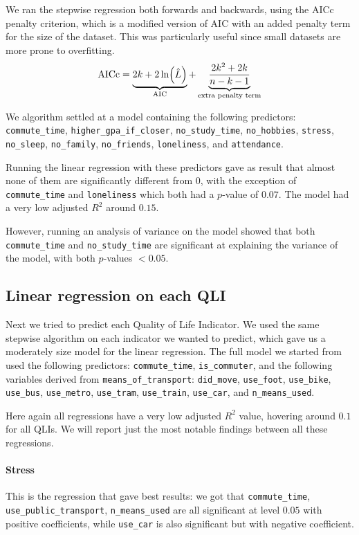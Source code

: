 \documentclass[11pt]{extarticle}
\numberwithin{table}{section}
\numberwithin{figure}{section}
\numberwithin{equation}{section}
\begin{document}
We ran the stepwise regression both forwards and backwards,
using the AICc penalty criterion, which is a modified version of AIC with an added penalty term
for the size of the dataset.
This was particularly useful since small datasets are more prone to overfitting.
\begin{equation}
	{\operatorfont AICc} =
	\underbrace{2k + 2 \ln (\hat L)}_{\operatorfont AIC}
	+ \underbrace{\frac {2k^{2}+2k}{n-k-1}}_{\text{extra penalty term}}
\end{equation}

We algorithm settled at a model containing the following predictors:
\texttt{commute\_time},
\texttt{higher\_gpa\_if\_closer},
\texttt{no\_study\_time},
\texttt{no\_hobbies},
\texttt{stress},
\texttt{no\_sleep},
\texttt{no\_family},
\texttt{no\_friends},
\texttt{loneliness}, and
\texttt{attendance}.

Running the linear regression with these predictors gave as result that almost none of them
are significantly different from $0$, with the exception of
\texttt{commute\_time} and \texttt{loneliness} which both had a $p$-value of $0.07$.
The model had a very low adjusted $R^2$ around $0.15$.

However, running an analysis of variance on the model showed that both
\texttt{commute\_time} and \texttt{no\_study\_time} are significant
at explaining the variance of the model, with both $p$-values $<0.05$.

\subsection{Linear regression on each QLI}

Next we tried to predict each Quality of Life Indicator.
We used the same stepwise algorithm on each indicator we wanted to predict,
which gave us a moderately size model for the linear regression.
The full model we started from used the following predictors:
\texttt{commute\_time},
\texttt{is\_commuter}, and the following variables derived from \texttt{means\_of\_transport}:
\texttt{did\_move},
\texttt{use\_foot},
\texttt{use\_bike},
\texttt{use\_bus},
\texttt{use\_metro},
\texttt{use\_tram},
\texttt{use\_train},
\texttt{use\_car}, and
\texttt{n\_means\_used}.

Here again all regressions have a very low adjusted $R^2$ value, hovering around $0.1$ for all QLIs.
We will report just the most notable findings between all these regressions.

\paragraph{Stress}
This is the regression that gave best results:
we got that
\texttt{commute\_time},
\texttt{use\_public\_transport},
\texttt{n\_means\_used}
are all significant at level $0.05$ with positive coefficients,
while \texttt{use\_car} is also significant but with negative coefficient.
\end{document}
